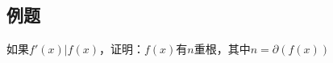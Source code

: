 \subsection{例题}
\begin{theorem}
	如果$f'(x)|f(x)$，证明：$f(x)$有$n$重根，其中$n=\partial(f(x))$
\end{theorem}





